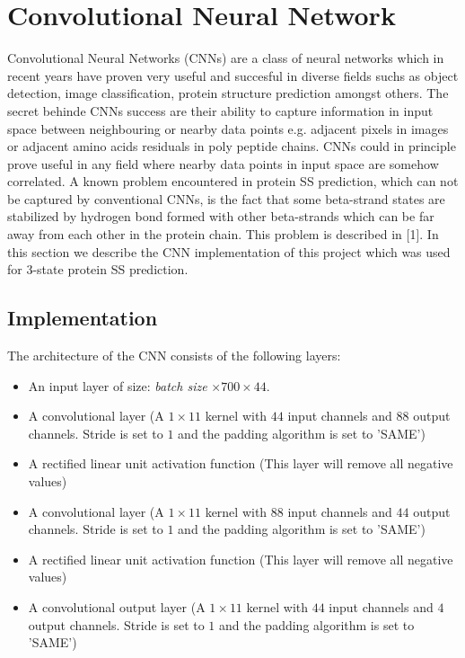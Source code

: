 \documentclass{article}
\begin{document}
\section{Convolutional Neural Network}
\label{sec:convolutional}
Convolutional Neural Networks (CNNs) are a class of neural networks which in recent years have proven very useful and succesful in diverse fields suchs as object detection, image classification, protein structure prediction amongst others. The secret behinde CNNs success are their ability to capture information in input space between neighbouring or nearby data points e.g. adjacent pixels in images or adjacent amino acids residuals in poly peptide chains. CNNs could in principle prove useful in any field where nearby data points in input space are somehow correlated. A known problem encountered in protein SS prediction, which can not be captured by conventional CNNs, is the fact that some beta-strand states are stabilized by hydrogen bond formed with other beta-strands which can be far away from each other in the protein chain. This problem is described in [1]. In this section we describe the CNN implementation of this project which was used for 3-state protein SS prediction.       

\subsection{Implementation}
The architecture of the CNN consists of the following layers:
\begin{itemize}
\item An input layer of size: \textit{batch size} $\times700\times44$. 
\item A convolutional layer (A $1\times11$ kernel with $44$ input channels and $88$ output channels. Stride is set to $1$ and the padding algorithm is set to 'SAME') 
\item A rectified linear unit activation function (This layer will remove all negative values)
\item A convolutional layer (A $1\times11$ kernel with $88$ input channels and $44$ output channels. Stride is set to $1$ and the padding algorithm is set to 'SAME') 
\item A rectified linear unit activation function (This layer will remove all negative values)
\item A convolutional output layer (A $1\times11$ kernel with $44$ input channels and $4$ output channels. Stride is set to $1$ and the padding algorithm is set to 'SAME') 
\end{itemize}  
\end{document}
